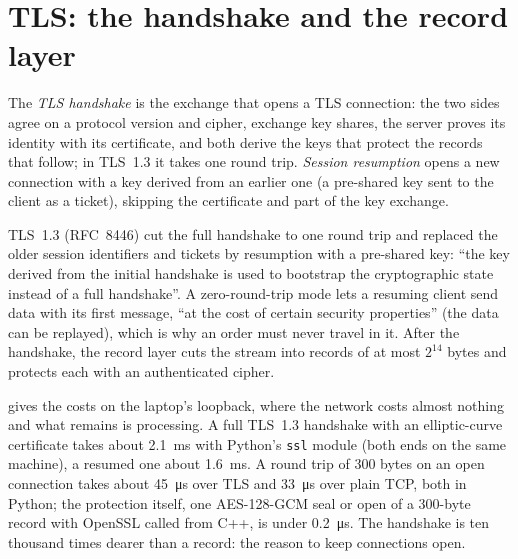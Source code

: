 \section{TLS: the handshake and the record layer}

\begin{definition}\label{def:ll:websocket-rest-tls-and-json-at-speed:tls}
The \emph{TLS handshake} is the exchange that opens a TLS connection: the two sides agree on a protocol
version and cipher, exchange key shares, the server proves its identity with its certificate, and both derive the keys that
protect the records that follow; in TLS~1.3 it takes one round trip. \emph{Session resumption}
opens a new connection with a key derived from an earlier one (a pre-shared key sent to the client as a ticket), skipping
the certificate and part of the key exchange.
\end{definition}

TLS~1.3 (RFC~8446) cut the full handshake to one round trip and replaced the older session identifiers and tickets by
resumption with a pre-shared key: ``the key derived from the initial handshake is used to bootstrap the cryptographic state
instead of a full handshake''. A zero-round-trip mode lets a resuming client send data with its first message, ``at the cost
of certain security properties'' (the data can be replayed), which is why an order must never travel in it. After the
handshake, the record layer cuts the stream into records of at most $2^{14}$ bytes and protects each with an authenticated
cipher.

 gives the costs on the laptop's loopback, where the network costs
almost nothing and what remains is processing. A full TLS~1.3 handshake with an elliptic-curve certificate takes about
\qty{2.1}{\milli\second} with Python's \texttt{ssl} module (both ends on the same machine), a resumed one about
\qty{1.6}{\milli\second}. A round trip of 300 bytes on an open connection takes about \qty{45}{\micro\second} over TLS and
\qty{33}{\micro\second} over plain TCP, both in Python; the protection itself, one AES-128-GCM seal or open of a 300-byte
record with OpenSSL called from C++, is under \qty{0.2}{\micro\second}. The handshake is ten thousand times dearer than a record:
the reason to keep connections open.

